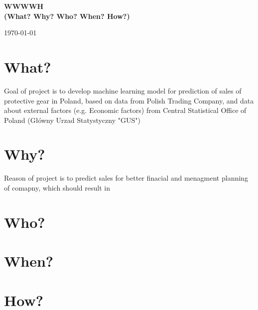 \documentclass{article}
\begin{document}
\begin{titlepage}
    \centering
    \vspace*{4cm}
    {\Huge\bfseries WWWWH \\ \large (What? Why? Who? When? How?) \par}
    \vspace{2cm}
    {\large  \par}
    \vfill
    \vspace{2cm}
    {\large \today\par}
\end{titlepage}

\newpage
\tableofcontents
\newpage    

\section{What?}
Goal of project is to develop machine learning model for prediction of sales of protective gear in Poland, based on data from Polish Trading Company, and data about external factors (e.g. Economic factors) from Central Statistical Office of Poland (Główny Urzad Statystyczny
"GUS")

\section{Why?}
Reason of project is to predict sales for better finacial and menagment planning of comapny, which should result in

\section{Who?}


\section{When?}


\section{How?}
\end{document}
